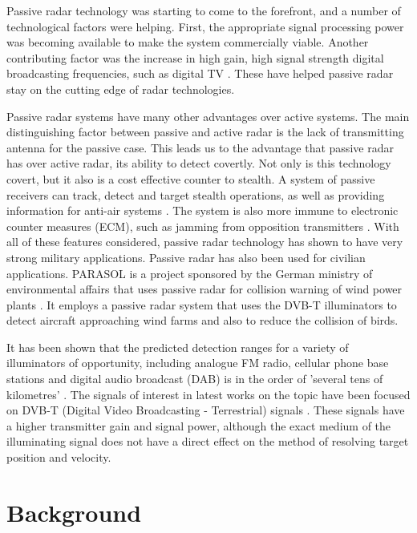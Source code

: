 \documentclass[12pt,openany,a4paper]{book}
\begin{document}
\bigskip

Passive radar technology was starting to come to the forefront, and a number of technological factors were helping. First, the appropriate signal processing power was becoming available to make the system commercially viable. Another contributing factor was the increase in high gain, high signal strength digital broadcasting frequencies, such as digital TV \cite{JE8}. These have helped passive radar stay on the cutting edge of radar technologies.

\bigskip

Passive radar systems have many other advantages over active systems. The main distinguishing factor between passive and active radar is the lack of transmitting antenna for the passive case. This leads us to the advantage that passive radar has over active radar, its ability to detect covertly. Not only is this technology covert, but it also is a cost effective counter to stealth. A system of passive receivers can track, detect and target stealth operations, as well as providing information for anti-air systems \cite{Arend}. The system is also more immune to electronic counter measures (ECM), such as jamming from opposition transmitters \cite{HK6}. With all of these features considered, passive radar technology has shown to have very strong military applications. Passive radar has also been used for civilian applications. PARASOL is a project sponsored by the German ministry of environmental affairs that uses passive radar for collision warning of wind power plants \cite{HK5}. It employs a passive radar system that uses the DVB-T illuminators to detect aircraft approaching wind farms and also to reduce the collision of birds.

\bigskip

It has been shown that the predicted detection ranges for a variety of illuminators of opportunity, including analogue FM radio, cellular phone base stations and digital audio broadcast (DAB) is in the order of 'several tens of kilometres' \cite{HD9}. The signals of interest in latest works on the topic have been focused on DVB-T (Digital Video Broadcasting - Terrestrial) signals \cite{gcc,MB11,MC12,MK13}. These signals have a higher transmitter gain and signal power, although the exact medium of the illuminating signal does not have a direct effect on the method of resolving target position and velocity.

\cleardoublepage

\chapter{Background}
\end{document}
